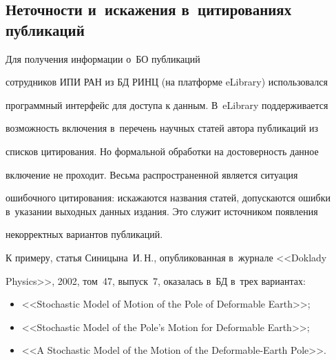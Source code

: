 \subsection{Неточности и~искажения в~цитированиях публикаций }





\vspace*{-2pt}





  Для получения информации о~БО публикаций


сотрудников ИПИ РАН из БД РИНЦ (на платформе eLibrary) использовался


программный интерфейс для доступа к данным. В~eLibrary поддерживается


возможность включения в~перечень научных статей автора публикаций из


списков цитирования. Но формальной обработки на достоверность данное


включение не проходит. Весьма распространенной является ситуация


ошибочного цитирования: искажаются названия статей, допускаются ошибки в~указании выходных данных издания. Это служит источником появления


некорректных вариантов публикаций.





  К примеру, статья Синицына~И.\,Н., опубликованная в~журнале <<Doklady


Physics>>, 2002, том~47, выпуск~7, оказалась в~БД в~трех вариантах:


  \begin{itemize}


\item <<Stochastic Model of Motion of the Pole of Deformable Earth>>;


\item <<Stochastic Model of the Pole's Motion for Deformable Earth>>;


\item <<A Stochastic Model of the Motion of the Deformable-Earth Pole>>.


\end{itemize}





\vspace*{-4pt}






